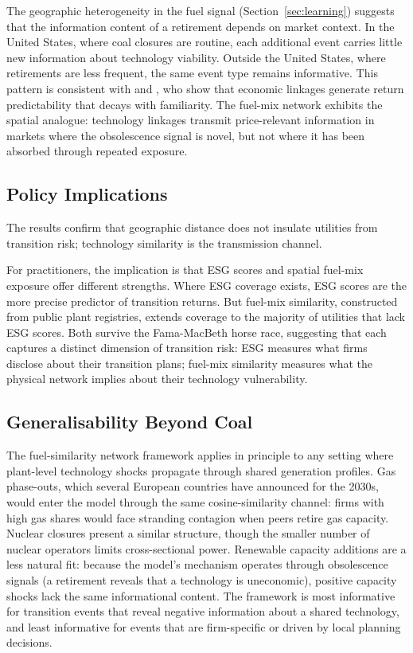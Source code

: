 \documentclass[12pt,a4paper]{article}
\begin{document}
The geographic heterogeneity in the fuel signal (Section~\ref{sec:learning}) suggests that the information content of a retirement depends on market context. In the United States, where coal closures are routine, each additional event carries little new information about technology viability. Outside the United States, where retirements are less frequent, the same event type remains informative. This pattern is consistent with \citet{CohenFrazzini2008} and \citet{MenzlyOzbas2010}, who show that economic linkages generate return predictability that decays with familiarity. The fuel-mix network exhibits the spatial analogue: technology linkages transmit price-relevant information in markets where the obsolescence signal is novel, but not where it has been absorbed through repeated exposure.

\subsection{Policy Implications}\label{sec:policy}

The results confirm that geographic distance does not insulate utilities from transition risk; technology similarity is the transmission channel.

For practitioners, the implication is that ESG scores and spatial fuel-mix exposure offer different strengths. Where ESG coverage exists, ESG scores are the more precise predictor of transition returns. But fuel-mix similarity, constructed from public plant registries, extends coverage to the majority of utilities that lack ESG scores. Both survive the Fama-MacBeth horse race, suggesting that each captures a distinct dimension of transition risk: ESG measures what firms disclose about their transition plans; fuel-mix similarity measures what the physical network implies about their technology vulnerability.

\subsection{Generalisability Beyond Coal}\label{sec:generalisability}

The fuel-similarity network framework applies in principle to any setting where plant-level technology shocks propagate through shared generation profiles. Gas phase-outs, which several European countries have announced for the 2030s, would enter the model through the same cosine-similarity channel: firms with high gas shares would face stranding contagion when peers retire gas capacity. Nuclear closures present a similar structure, though the smaller number of nuclear operators limits cross-sectional power. Renewable capacity additions are a less natural fit: because the model's mechanism operates through obsolescence signals (a retirement reveals that a technology is uneconomic), positive capacity shocks lack the same informational content. The framework is most informative for transition events that reveal negative information about a shared technology, and least informative for events that are firm-specific or driven by local planning decisions.
\end{document}
